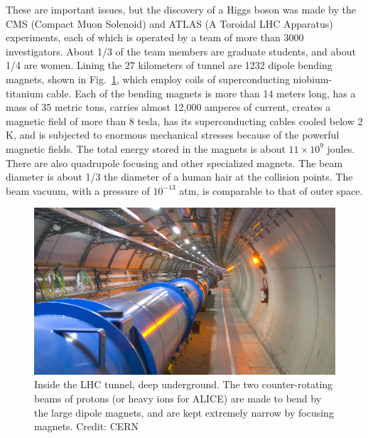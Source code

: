 \documentclass[12pt]{iopart}
\begin{document}
These are important issues, but the discovery of a Higgs boson was made by the CMS (Compact Muon Solenoid) and ATLAS  (A Toroidal LHC Apparatus) experiments, each of which is operated by a team of more than 3000 investigators. About 1/3 of the team members are graduate students, and about 1/4 are women. Lining  the 27 kilometers of tunnel are 1232 dipole bending magnets, shown in Fig.~\ref{Fig13-CE0085H.eps}, which employ coils of superconducting niobium-titanium cable. Each of the bending magnets is more than 14 meters long, has a mass of 35 metric tons, carries almost 12,000 amperes of current, creates a magnetic field of more than 8 tesla, has its superconducting cables cooled below 2 K, and is subjected to enormous mechanical stresses because of the powerful magnetic fields. The total energy stored in the magnets is about $11 \times 10^9$ joules. There are also quadrupole focusing and other specialized magnets. The beam diameter is about 1/3 the diameter of a human hair at the collision points. The beam vacuum, with a pressure of $10^{-13}$ atm, is comparable to that of outer space. 
\begin{figure}[htbp]
\centering
\includegraphics[bb=0 0 360 200, width=5in]{Fig13-CE0085H.eps}
\caption{Inside the LHC tunnel, deep underground. The two counter-rotating beams of protons (or heavy ions for ALICE) are made to bend by the large dipole magnets, and are kept extremely narrow by focusing magnets. Credit: CERN \label{Fig13-CE0085H.eps}}
\end{figure}
\end{document}
